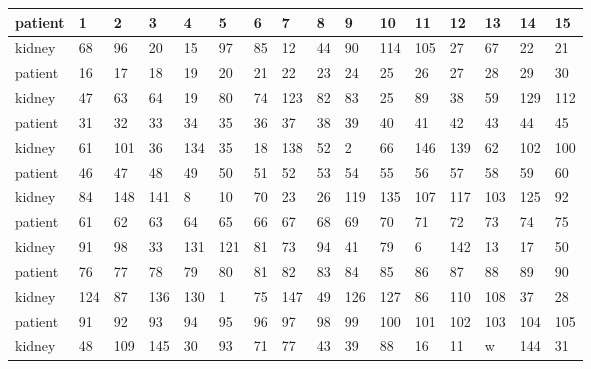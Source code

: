 \documentclass{article}
\begin{document}
\begin{table}[H]
	\begin{tabular}{llllllllllllllll}
        \toprule
        patient & 1  & 2  & 3  & 4  & 5  & 6  & 7  & 8  & 9  & 10  & 11  & 12 & 13 & 14 & 15 \\ \midrule
        kidney  & 68 & 96 & 20 & 15 & 97 & 85 & 12 & 44 & 90 & 114 & 105 & 27 & 67 & 22 & 21 \\
        \bottomrule

        \toprule
        patient & 16 & 17 & 18 & 19 & 20 & 21 & 22  & 23 & 24 & 25 & 26 & 27 & 28 & 29  & 30  \\ \midrule
        kidney  & 47 & 63 & 64 & 19 & 80 & 74 & 123 & 82 & 83 & 25 & 89 & 38 & 59 & 129 & 112 \\
        \bottomrule

        \toprule
        patient & 31 & 32  & 33 & 34  & 35 & 36 & 37  & 38 & 39 & 40 & 41  & 42  & 43 & 44  & 45  \\ \midrule
        kidney  & 61 & 101 & 36 & 134 & 35 & 18 & 138 & 52 & 2  & 66 & 146 & 139 & 62 & 102 & 100 \\
        \bottomrule

        \toprule
        patient & 46 & 47  & 48  & 49 & 50 & 51 & 52 & 53 & 54  & 55  & 56  & 57  & 58  & 59  & 60 \\ \midrule
        kidney  & 84 & 148 & 141 & 8  & 10 & 70 & 23 & 26 & 119 & 135 & 107 & 117 & 103 & 125 & 92 \\ 
        \bottomrule
        
        \toprule
        patient & 61 & 62 & 63 & 64  & 65  & 66 & 67 & 68 & 69 & 70 & 71 & 72  & 73 & 74 & 75 \\ \midrule
        kidney  & 91 & 98 & 33 & 131 & 121 & 81 & 73 & 94 & 41 & 79 & 6  & 142 & 13 & 17 & 50 \\ 
        \bottomrule

        \toprule
        patient & 76  & 77 & 78  & 79  & 80 & 81 & 82  & 83 & 84  & 85  & 86 & 87  & 88  & 89 & 90 \\ \midrule
        kidney  & 124 & 87 & 136 & 130 & 1  & 75 & 147 & 49 & 126 & 127 & 86 & 110 & 108 & 37 & 28 \\ 
        \bottomrule

        \toprule
        patient & 91 & 92  & 93  & 94 & 95 & 96 & 97 & 98 & 99 & 100 & 101 & 102 & 103 & 104 & 105 \\ \midrule
        kidney  & 48 & 109 & 145 & 30 & 93 & 71 & 77 & 43 & 39 & 88  & 16  & 11  & w   & 144 & 31 \\ 
        \bottomrule


\end{tabular}
\end{table}
\end{document}
